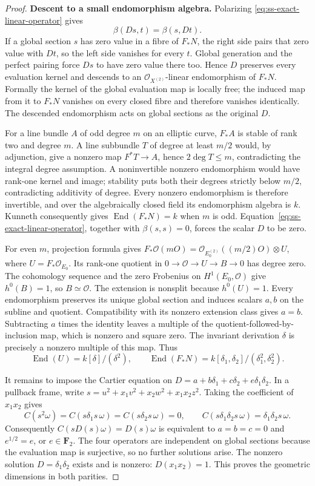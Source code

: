 \begin{proof}
\par\smallskip\noindent\textbf{Descent to a small endomorphism algebra.}
Polarizing \eqref{eq:ss-exact-linear-operator} gives
\[
                   \beta(Ds,t)=\beta(s,Dt).
\]
If a global section $s$ has zero value in a fibre of $F_*N$,
the right side pairs that zero value with $Dt$, so the left
side vanishes for every $t$. Global generation and the perfect
pairing force $Ds$ to have zero value there too.
Hence $D$ preserves every evaluation kernel and descends to an
$\mathcal O_{X^{(2)}}$-linear endomorphism of $F_*N$.
Formally the kernel of the global evaluation map is locally free;
the induced map from it to $F_*N$ vanishes on every closed fibre
and therefore vanishes identically. The descended endomorphism
acts on global sections as the original $D$.

For a line bundle $A$ of odd degree $m$ on an elliptic curve,
$F_*A$ is stable of rank two and degree $m$.
A line subbundle $T$ of degree at least $m/2$ would, by adjunction,
give a nonzero map $F^*T\to A$, hence $2\deg T\le m$,
contradicting the integral degree assumption. A noninvertible
nonzero endomorphism would have rank-one kernel and image; stability
puts both their degrees strictly below $m/2$, contradicting
additivity of degree. Every nonzero endomorphism is therefore
invertible, and over the algebraically closed field its endomorphism
algebra is $k$. Kunneth consequently gives
$\operatorname{End}(F_*N)=k$ when $m$ is odd.
Equation~\eqref{eq:ss-exact-linear-operator}, together with
$\beta(s,s)=0$, forces the scalar $D$ to be zero.

For even $m$, projection formula gives
$F_*\mathcal O(mO)=\mathcal O_{E_0^{(2)}}((m/2)O)\otimes U$,
where $U=F_*\mathcal O_{E_0}$. Its rank-one quotient in
$0\to\mathcal O\to U\to B\to0$ has degree zero. The cohomology
sequence and the zero Frobenius on $H^1(E_0,\mathcal O)$ give
$h^0(B)=1$, so $B\simeq\mathcal O$.
The extension is nonsplit because $h^0(U)=1$.
Every endomorphism preserves its unique global section and induces
scalars $a,b$ on the subline and quotient. Compatibility with its
nonzero extension class gives $a=b$. Subtracting $a$ times the
identity leaves a multiple of the quotient-followed-by-inclusion
map, which is nonzero and square zero. The invariant derivation
$\delta$ is precisely a nonzero multiple of this map. Thus
\[
 \operatorname{End}(U)=k[\delta]/(\delta^2),\qquad
 \operatorname{End}(F_*N)
       =k[\delta_1,\delta_2]/(\delta_1^2,\delta_2^2).
\]

It remains to impose the Cartier equation on
$D=a+b\delta_1+c\delta_2+e\delta_1\delta_2$.
In a pullback frame, write
$s=u^2+x_1v^2+x_2w^2+x_1x_2z^2$.
Taking the coefficient of $x_1x_2$ gives
\[
 C(s^2\omega)=C(s\delta_1s\,\omega)
 =C(s\delta_2s\,\omega)=0,
 \qquad C(s\delta_1\delta_2s\,\omega)=\delta_1\delta_2s\,\omega.
\]
Consequently $C(sD(s)\omega)=D(s)\omega$ is equivalent to
$a=b=c=0$ and $e^{1/2}=e$, or $e\in\mathbf F_2$.
The four operators are independent on global sections because
the evaluation map is surjective, so no further solutions arise.
The nonzero solution $D=\delta_1\delta_2$ exists and is nonzero:
$D(x_1x_2)=1$. This proves the geometric dimensions in both parities.


\end{proof}
